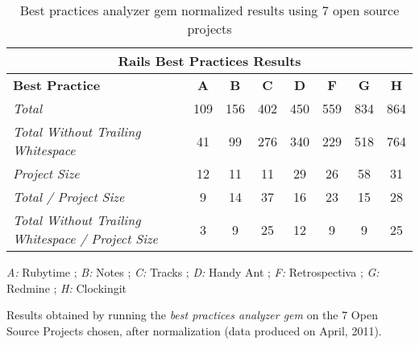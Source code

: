 \begin{table}[H]
\begin{center}
{\scriptsize
\begin{threeparttable}
\begin{tabular}{|l||c|c|c|c|c|c|c|} \hline
\multicolumn{8}{|c|}{Rails Best Practices Results} \\ \hline
\textbf{Best Practice}& \textbf{A}& \textbf{B}& \textbf{C}&  \textbf{D}& \textbf{F}& \textbf{G}& \textbf{H} \\\hline\hline
\emph{Total                                           }              & 109  & 156  & 402  & 450 & 559 & 834 & 864  \\ \hline
\emph{Total Without Trailing Whitespace               }              &  41  &  99  & 276  & 340 & 229 & 518 & 764  \\ \hline
\emph{Project Size                                    }              &  12  &  11  &  11  &  29 &  26 &  58 &  31  \\ \hline
\emph{Total / Project Size                            }              &   9  &  14  &  37  &  16 &  23 &  15 &  28  \\ \hline
\emph{Total Without Trailing Whitespace / Project Size}              &   3  &   9  &  25  &  12 &   9 &   9 &  25  \\ \hline
\end{tabular}
\begin{tablenotes}
  \item \emph{A:} Rubytime
  ; \emph{B:} Notes
  ; \emph{C:} Tracks
  ; \emph{D:} Handy Ant
  ; \emph{F:} Retrospectiva
  ; \emph{G:} Redmine
  ; \emph{H:} Clockingit
  \item Results obtained by running the \emph{best practices analyzer gem} on the 7 Open Source Projects chosen, 
        after normalization (data produced on April, 2011).
\end{tablenotes}
\end{threeparttable}
}
\end{center}
\caption{Best practices analyzer gem normalized results using 7 open source projects}
\end{table}